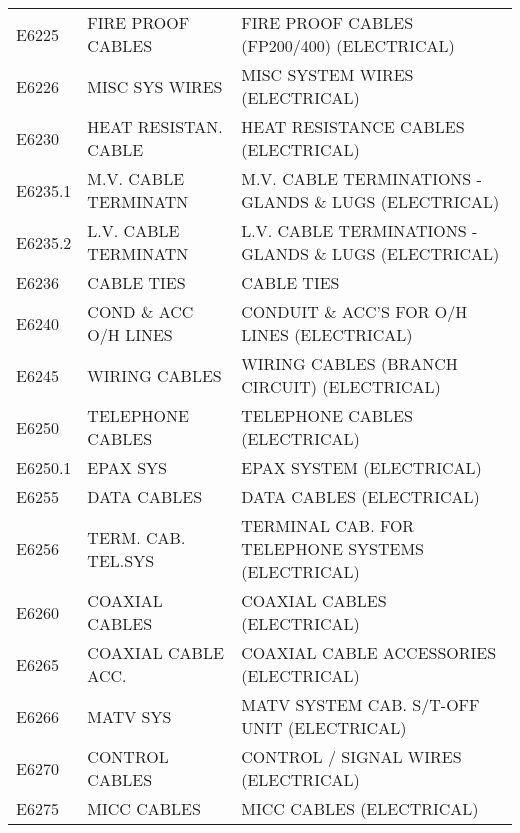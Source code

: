 \begin{longtable}[l]{l%
                  l|%
                  l|}
\rowcolor{thetableheadbgcolor!0.25!white} E6225       & FIRE PROOF CABLES   & FIRE PROOF CABLES (FP200/400) (ELECTRICAL)   \\
\rowcolor{thetableheadbgcolor!0.25!white} E6226       & MISC SYS WIRES   & MISC SYSTEM WIRES (ELECTRICAL)   \\
\rowcolor{thetableheadbgcolor!0.25!white} E6230       & HEAT RESISTAN. CABLE   & HEAT RESISTANCE CABLES (ELECTRICAL)   \\
\rowcolor{thetableheadbgcolor!0.25!white} E6235.1     & M.V. CABLE TERMINATN   & M.V. CABLE TERMINATIONS - GLANDS \& LUGS (ELECTRICAL)   \\
\rowcolor{thetableheadbgcolor!0.25!white} E6235.2     & L.V. CABLE TERMINATN   & L.V. CABLE TERMINATIONS - GLANDS \& LUGS (ELECTRICAL)   \\
\rowcolor{thetableheadbgcolor!0.25!white} E6236       & CABLE TIES   & CABLE TIES   \\
\rowcolor{thetableheadbgcolor!0.25!white} E6240       & COND \& ACC O/H LINES   & CONDUIT \& ACC'S FOR O/H LINES (ELECTRICAL)   \\
\rowcolor{thetableheadbgcolor!0.25!white} E6245       & WIRING CABLES   & WIRING CABLES (BRANCH CIRCUIT) (ELECTRICAL)   \\
\rowcolor{thetableheadbgcolor!0.25!white} E6250       & TELEPHONE CABLES   & TELEPHONE CABLES (ELECTRICAL)   \\
\rowcolor{thetableheadbgcolor!0.25!white} E6250.1     & EPAX SYS   & EPAX SYSTEM (ELECTRICAL)   \\
\rowcolor{thetableheadbgcolor!0.25!white} E6255       & DATA CABLES   & DATA CABLES (ELECTRICAL)   \\
\rowcolor{thetableheadbgcolor!0.25!white} E6256       & TERM. CAB. TEL.SYS   & TERMINAL CAB. FOR TELEPHONE SYSTEMS (ELECTRICAL)   \\
\rowcolor{thetableheadbgcolor!0.25!white} E6260       & COAXIAL CABLES   & COAXIAL CABLES (ELECTRICAL)   \\
\rowcolor{thetableheadbgcolor!0.25!white} E6265       & COAXIAL CABLE ACC.   & COAXIAL CABLE ACCESSORIES (ELECTRICAL)   \\
\rowcolor{thetableheadbgcolor!0.25!white} E6266       & MATV SYS   & MATV SYSTEM CAB. S/T-OFF UNIT (ELECTRICAL)   \\
\rowcolor{thetableheadbgcolor!0.25!white} E6270       & CONTROL CABLES   & CONTROL / SIGNAL WIRES (ELECTRICAL)   \\
\rowcolor{thetableheadbgcolor!0.25!white} E6275       & MICC CABLES   & MICC CABLES (ELECTRICAL)   \\

\end{longtable}
